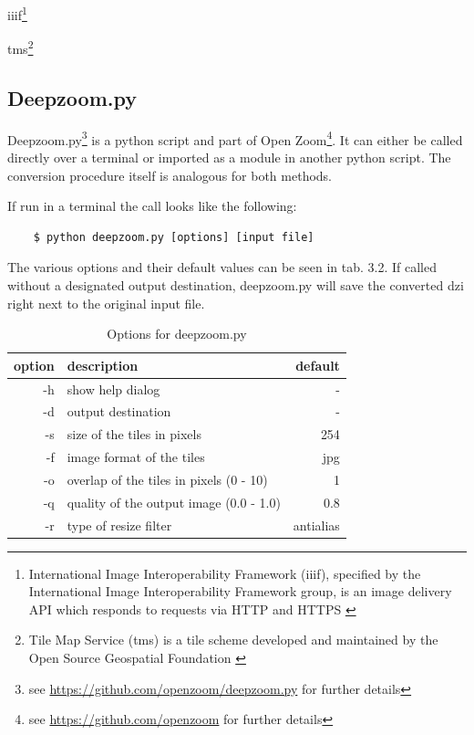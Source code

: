 iiif\footnote{International Image Interoperability Framework (iiif), specified by the International Image Interoperability Framework group, is an image delivery API which responds to requests via HTTP and HTTPS \cite{web:iiif}}

tms\footnote{Tile Map Service (tms) is a tile scheme developed and maintained by the Open Source Geospatial Foundation \cite{web:tms}} 


\subsection{Deepzoom.py}

Deepzoom.py\footnote{see \url{https://github.com/openzoom/deepzoom.py} for further details} is a python script and part of Open Zoom\footnote{see \url{https://github.com/openzoom} for further details}. It can either be called directly over a terminal or imported as a module in another python script. The conversion procedure itself is analogous for both methods.

If run in a terminal the call looks like the following:

\begin{lstlisting}
	$ python deepzoom.py [options] [input file]
\end{lstlisting}

The various options and their default values can be seen in tab. 3.2. If called without a designated output destination, deepzoom.py will save the converted dzi right next to the original input file.

\begin{table}[H]
	\begin{center}
		\begin{tabular}{| r | l | r |}
			\hline
			\textbf{option} & \textbf{description} & \textbf{default} \\ \hline
			-h & show help dialog & - \\ \hline
			-d & output destination & - \\ \hline
			-s & size of the tiles in pixels & 254 \\ \hline
			-f & image format of the tiles & jpg\\ \hline
			-o & overlap of the tiles in pixels (0 - 10) & 1 \\ \hline
			-q & quality of the output image (0.0 - 1.0) & 0.8 \\ \hline
			-r & type of resize filter & antialias \\ \hline
		\end{tabular}
		\caption{Options for deepzoom.py}
	\end{center}
\end{table}

